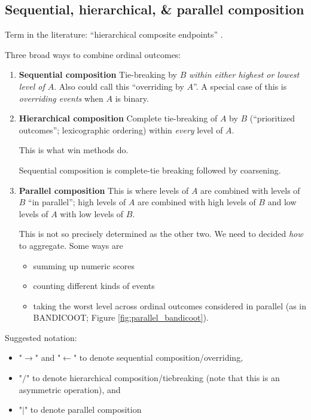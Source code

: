 \documentclass[
  11pt,
  fleqn
]{article}
\begin{document}
\subsection{Sequential,
hierarchical, \& parallel composition}

Term in the literature: ``hierarchical composite endpoints''
\citep{gasparyanDesignAnalysisStudies2022}.

Three broad ways to combine ordinal outcomes:
\begin{enumerate}
  \item \textbf{Sequential composition} Tie-breaking by $B$
    \emph{within either highest or lowest level of $A$}. Also could
    call this ``overriding by $A$''. A special case of this is
    \emph{overriding events} when $A$ is binary.

  \item \textbf{Hierarchical composition} Complete tie-breaking of $A$ by
    $B$ (``prioritized outcomes''; lexicographic ordering) within
    \emph{every} level of $A$.

    This is what win methods do.

    Sequential composition is complete-tie breaking followed by coarsening.

  \item \textbf{Parallel composition} This is where levels of $A$ are
    combined with levels of $B$ ``in parallel''; high levels of $A$
    are combined with high levels of $B$ and low levels of $A$ with
    low levels of $B$.

    This is not so precisely determined as the other two. We need to
    decided \emph{how} to aggregate. Some ways are
    \begin{itemize}
      \item summing up numeric
        scores
      \item counting different kinds of events
      \item taking the worst level across ordinal outcomes considered
        in parallel (as in BANDICOOT; Figure \ref{fig:parallel_bandicoot}).
    \end{itemize}
\end{enumerate}

Suggested notation:
\begin{itemize}
  \item "$\rightarrow$" and "$\leftarrow$" to denote sequential
    composition/overriding,
  \item "$/$" to denote hierarchical composition/tiebreaking
    (note that this is an asymmetric operation), and
  \item "$|$" to denote parallel composition
\end{itemize}
\end{document}
